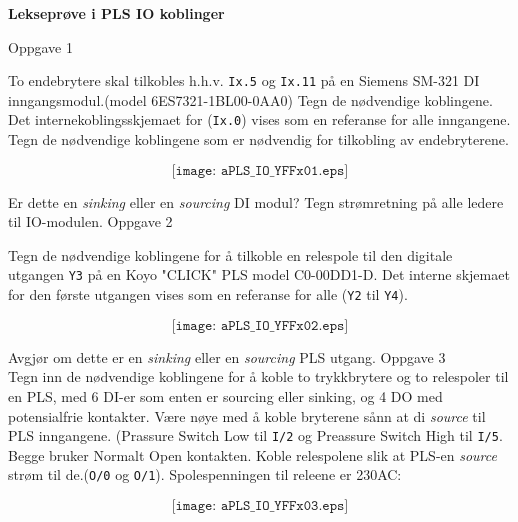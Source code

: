 

\centerline{\bf Lekseprøve i PLS IO koblinger}  \bigskip

Oppgave 1

To endebrytere skal tilkobles h.h.v. \texttt{Ix.5} og \texttt{Ix.11} på en Siemens SM-321 DI inngangsmodul.(model 6ES7321-1BL00-0AA0) Tegn de nødvendige koblingene. Det internekoblingsskjemaet for (\texttt{Ix.0}) vises som en referanse for alle inngangene.
Tegn de nødvendige koblingene som er nødvendig for tilkobling av endebryterene.  


$$\texttt{[image: aPLS\_IO\_YFFx01.eps]}$$

Er dette en \textit{sinking} eller en \textit{sourcing} DI modul?
Tegn strømretning på alle ledere til IO-modulen. 
\vfil
\eject 
Oppgave 2


Tegn de nødvendige koblingene for å tilkoble en relespole til den digitale utgangen \texttt{Y3} på en Koyo "CLICK" PLS model C0-00DD1-D. Det interne skjemaet for den første utgangen vises som en referanse for alle (\texttt{Y2} til \texttt{Y4}). 


$$\texttt{[image: aPLS\_IO\_YFFx02.eps]}$$

Avgjør om dette er en \textit{sinking} eller en \textit{sourcing} PLS utgang. 
\eject
Oppgave 3\\

Tegn inn de nødvendige koblingene for å koble to trykkbrytere og to relespoler til en PLS, med 6 DI-er som enten er sourcing eller sinking, og 4 DO med potensialfrie kontakter. Være nøye med å koble bryterene sånn at di \textit{source} til PLS inngangene. (Prassure Switch Low til \texttt{I/2} og Preassure Switch High til \texttt{I/5}. Begge bruker Normalt Open  kontakten. Koble relespolene slik at PLS-en \textit{source} strøm til de.(\texttt{O/0} og \texttt{O/1}). Spolespenningen til releene er 230AC:

\vfil
\eject 
$$\texttt{[image: aPLS\_IO\_YFFx03.eps]}$$


